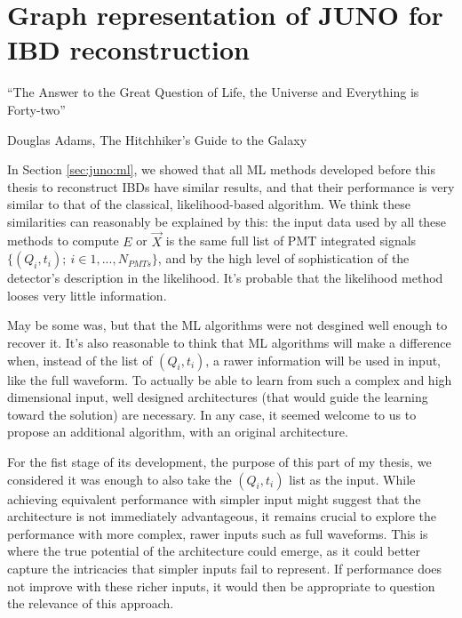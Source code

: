 \documentclass[../main.tex]{subfiles}
\begin{document}
\chapter{Graph representation of JUNO for IBD reconstruction}
\label{sec:jgnn}
\epigraph{``The Answer to the Great Question of Life, the Universe and Everything is Forty-two''}{Douglas Adams, The Hitchhiker's Guide to the Galaxy}

\minitoc


In Section \ref{sec:juno:ml}, we showed that all ML methods developed before this thesis to reconstruct IBDs have similar results, and that their performance is very similar to that of the classical, likelihood-based algorithm.
We think these similarities can reasonably be explained by this: the input data used by all these methods to compute $E$ or $\vec{X}$  is the same full list of PMT integrated signals $ \{ (Q_i,t_i) ; ~ i \in  1, ..., N_{PMTs} \}$, and by the high level of sophistication of the detector's description in the likelihood. It's probable that the likelihood method looses very little information.

May be some was, but that the ML algorithms were not desgined well enough to recover it. It's also reasonable to think that ML algorithms will make a difference when, instead of the list of $(Q_i, t_i)$, a rawer information will be used in input, like the full waveform.
To actually be able to learn from such a complex and high dimensional input, well designed architectures (that would guide the learning toward the solution) are necessary. In any case, it seemed welcome to us to propose an additional algorithm, with an original architecture.

For the fist stage of its development, the purpose of this part of my thesis, we considered it was enough to also take the $(Q_i, t_i)$ list as the input.
While achieving equivalent performance with simpler input might suggest that the architecture is not immediately advantageous, it remains crucial to explore the performance with more complex, rawer inputs such as full waveforms. This is where the true potential of the architecture could emerge, as it could better capture the intricacies that simpler inputs fail to represent. If performance does not improve with these richer inputs, it would then be appropriate to question the relevance of this approach.
\end{document}
